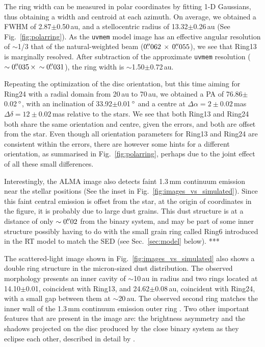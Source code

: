 \documentclass[letters,usenatbib,times]{mnras}
\begin{document}
The ring width can be measured in polar coordinates by fitting 1-D Gaussians, thus obtaining a width and centroid at each azimuth. On average, we obtained a FWHM of 2.87$\pm$0.50\,au, and a stellocentric radius of 13.32$\pm$0.26\,au (See Fig.~\ref{fig:polarring}). As the {\tt uvmem} model image has an effective angular resolution of $\sim$1/3 that of the natural-weighted beam ($0\hbox{$.\!\!^{\prime\prime}$}062 \,\times \, 0\hbox{$.\!\!^{\prime\prime}$}055$), we see that Ring13 is marginally resolved. After subtraction of the approximate {\tt uvmem} resolution ($\sim0\hbox{$.\!\!^{\prime\prime}$}035 \, \times \, \sim0\hbox{$.\!\!^{\prime\prime}$}031$), the ring width is $\sim$1.50$\pm$0.72\,au. 

Repeating the optimization of the disc orientation, but this time aiming for Ring24 with a radial domain from 20\,au to 70\,au, we obtained a PA of 76.86$\pm$0.02\,$\hbox{$^\circ$}$, with an inclination of 33.92$\pm$0.01\,$\hbox{$^\circ$}$ and a centre at $\Delta \alpha = 2\pm0.02$\,mas $\Delta \delta = 12\pm0.02$\,mas relative to the stars. We see that both Ring13 and Ring24 both share the same orientation and centre, given the errors, and both are offset from the star. Even though all orientation parameters for Ring13 and Ring24 are consistent within the errors, there are however some hints for a different orientation, as summarised in Fig.~\ref{fig:polarring}, perhaps due to the joint effect of all these small differences.

Interestingly, the ALMA image also detects faint 1.3\,mm continuum emission near the stellar positions (See the inset in Fig.~\ref{fig:images_vs_simulated}). Since this faint central emission is offset from the star, at the origin of coordinates in the figure, it is probably due to large dust grains. This dust structure is at a distance of only $\sim0\hbox{$.\!\!^{\prime\prime}$}02$ from the binary system, and may be part of some inner structure possibly having to do with the small grain ring called Ring6 introduced in the RT model to match the SED (see Sec.~\ref{sec:model} below). ***

The scattered-light image shown in Fig.~\ref{fig:images_vs_simulated} also shows a double ring structure in the micron-sized dust distribution. The observed morphology presents an inner cavity of $\sim$10\,au in radius and two rings located at 14.10$\pm$0.01, coincident with Ring13, and 24.62$\pm$0.08\,au, coincident with Ring24, with a small gap between them at $\sim$20\,au. The observed second ring matches the inner wall of the 1.3\,mm continuum emission outer ring \citep{Ru_z_Rodr_guez_2019}. Two other important features that are present in the image are: the brightness asymmetry and the shadows projected on the disc produced by the close binary system as they eclipse each other, described in detail by \citet{dOrazi}.
\end{document}
